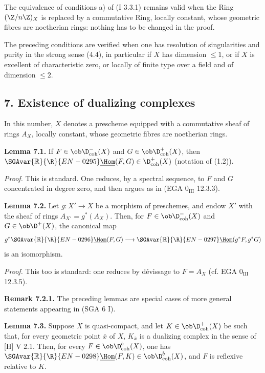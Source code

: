 The equivalence of conditions a) of (I 3.3.1) remains valid when the Ring $(\Z/n\Z)_X$ is replaced by a commutative Ring, locally constant, whose geometric fibres are noetherian rings: nothing has to be changed in the proof.

The preceding conditions are verified when one has resolution of singularities and purity in the strong sense (4.4), in particular if $X$ has dimension $\leq1$, or if $X$ is excellent of characteristic zero, or locally of finite type over a field and of dimension $\leq2$.

\subsection*{7. Existence of dualizing complexes}

In this number, $X$ denotes a prescheme equipped with a commutative sheaf of rings $A_X$, locally constant, whose geometric fibres are noetherian rings.

\textbf{Lemma 7.1.} If $F\in\ob\D^{-}_{\mathrm{coh}}(X)$ and $G\in\ob\D^{+}_{\mathrm{coh}}(X)$, then $\SGAvar{\mathbb{R}}{\R}{EN-0295}\underline{\Hom}(F,G)\in\D^{+}_{\mathrm{coh}}(X)$ (notation of (1.2)).

\emph{Proof.} This is standard. One reduces, by a spectral sequence, to $F$ and $G$ concentrated in degree zero, and then argues as in (EGA $0_{\mathrm{III}}$ 12.3.3).

\textbf{Lemma 7.2.} Let $g:X'\to X$ be a morphism of preschemes, and endow $X'$ with the sheaf of rings $A_{X'}=g^*(A_X)$. Then, for $F\in\ob\D^{-}_{\mathrm{coh}}(X)$ and $G\in\ob\D^{+}(X)$, the canonical map
\[
        g^*\SGAvar{\mathbb{R}}{\R}{EN-0296}\underline{\Hom}(F,G)\longrightarrow \SGAvar{\mathbb{R}}{\R}{EN-0297}\underline{\Hom}(g^*F,g^*G)
\]
is an isomorphism.

\emph{Proof.} This too is standard: one reduces by dévissage to $F=A_X$ (cf. EGA $0_{\mathrm{III}}$ 12.3.5).

\textbf{Remark 7.2.1.} The preceding lemmas are special cases of more general statements appearing in (SGA 6 I).

\textbf{Lemma 7.3.} Suppose $X$ is quasi-compact, and let $K\in\ob\D^{+}_{\mathrm{coh}}(X)$ be such that, for every geometric point $\bar{x}$ of $X$, $K_{\bar{x}}$ is a dualizing complex in the sense of [H] V 2.1. Then, for every $F\in\ob\D^{b}_{\mathrm{coh}}(X)$, one has $\SGAvar{\mathbb{R}}{\R}{EN-0298}\underline{\Hom}(F,K)\in\ob\D^{b}_{\mathrm{coh}}(X)$, and $F$ is reflexive relative to $K$.

